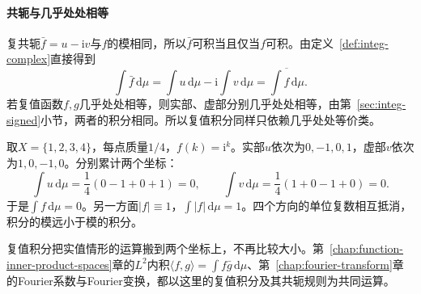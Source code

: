 \paragraph{共轭与几乎处处相等}
复共轭$\bar f=u-\mathrm iv$与$f$的模相同，所以$\bar f$可积当且仅当$f$可积。由定义~\ref{def:integ-complex}直接得到
\[
 \int\bar f\,\mathrm d\mu=\int u\,\mathrm d\mu-\mathrm i\int v\,\mathrm d\mu=\overline{\int f\,\mathrm d\mu}.
\]
若复值函数$f,g$几乎处处相等，则实部、虚部分别几乎处处相等，由第~\ref{sec:integ-signed}小节，两者的积分相同。所以复值积分同样只依赖几乎处处等价类。

\begin{example}[复值积分的抵消]
\label{ex:integ-complex-cancel}
取$X=\{1,2,3,4\}$，每点质量$1/4$，$f(k)=\mathrm i^k$。实部$u$依次为$0,-1,0,1$，虚部$v$依次为$1,0,-1,0$。分别累计两个坐标：
\[
 \int u\,\mathrm d\mu=\frac14(0-1+0+1)=0,\qquad\int v\,\mathrm d\mu=\frac14(1+0-1+0)=0 .
\]
于是$\int f\,\mathrm d\mu=0$。另一方面$\lvert f\rvert\equiv1$，$\int\lvert f\rvert\,\mathrm d\mu=1$。四个方向的单位复数相互抵消，积分的模远小于模的积分。
\end{example}

复值积分把实值情形的运算搬到两个坐标上，不再比较大小。第~\ref{chap:function-inner-product-spaces}章的$L^2$内积$\langle f,g\rangle=\int f\bar g\,\mathrm d\mu$、第~\ref{chap:fourier-transform}章的Fourier系数与Fourier变换，都以这里的复值积分及其共轭规则为共同运算。
